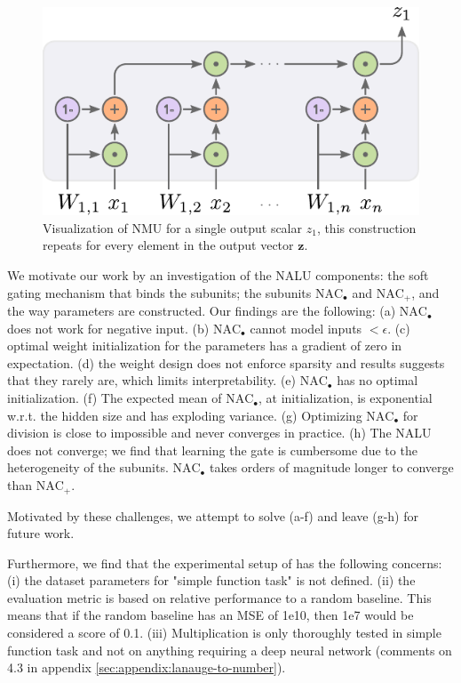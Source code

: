 \begin{figure}[h]
\centering
\includegraphics[scale=0.6]{graphics/nmu.pdf}
\caption{Visualization of NMU for a single output scalar $z_1$, this construction repeats for every element in the output vector $\mathbf{z}$.}
\end{figure}
We motivate our work by an investigation of the NALU components: the soft gating mechanism that binds the subunits; the subunits $\text{NAC}_{\bullet}$ and $\text{NAC}_{+}$, and the way parameters are constructed.
Our findings are the following:
(a) $\text{NAC}_{\bullet}$ does not work for negative input.
(b) $\text{NAC}_{\bullet}$ cannot model inputs $<\epsilon$.
(c) optimal weight initialization for the parameters has a gradient of zero in expectation.
(d) the weight design does not enforce sparsity and results suggests that they rarely are, which limits interpretability.
(e) $\text{NAC}_{\bullet}$ has no optimal initialization.
(f) The expected mean of $\text{NAC}_{\bullet}$, at initialization, is exponential w.r.t. the hidden size and has exploding variance.
(g) Optimizing $\text{NAC}_{\bullet}$ for division is close to impossible and never converges in practice.
(h) The NALU does not converge; we find that learning the gate is cumbersome due to the heterogeneity of the subunits. $\text{NAC}_{\bullet}$ takes orders of magnitude longer to converge than $\text{NAC}_{+}$.%

Motivated by these challenges, we attempt to solve (a-f) and leave (g-h) for future work.

Furthermore, we find that the experimental setup of \citet{trask-nalu} has the following concerns: (i) the dataset parameters for "simple function task" is not defined. (ii) the evaluation metric is based on relative performance to a random baseline. This means that if the random baseline has an MSE of 1e10, then 1e7 would be considered a score of 0.1. (iii) Multiplication is only thoroughly tested in simple function task and not on anything requiring a deep neural network (comments on 4.3 in appendix \ref{sec:appendix:lanauge-to-number}).

